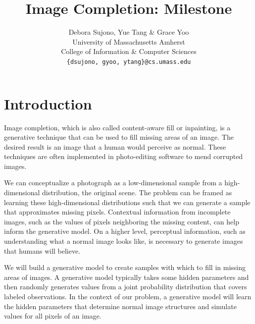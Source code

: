 \documentclass[10pt,twocolumn,letterpaper]{article}
\begin{document}
\title{Image Completion: Milestone}

\author{Debora Sujono, Yue Tang \& Grace Yoo \\ 
University of Massachusetts Amherst \\ 
College of Information \& Computer Sciences \\
{\tt\small \{dsujono, gyoo, ytang\}@cs.umass.edu} \\
}

\maketitle

\section{Introduction}
Image completion, which is also called content-aware fill or inpainting, is a generative technique that can be used to fill missing areas of an image. The desired result is an image that a human would perceive as normal. These techniques are often implemented in photo-editing software to mend corrupted images.

\par We can conceptualize a photograph as a low-dimensional sample from a high-dimensional distribution, the original scene. The problem can be framed as learning these high-dimensional distributions such that we can generate a sample that approximates missing pixels. Contextual information from incomplete images, such as the values of pixels neighboring the missing content, can help inform the generative model. On a higher level, perceptual information, such as understanding what a normal image looks like, is necessary to generate images that humans will believe. %

\par We will build a generative model to create samples with which to fill in missing areas of images. A generative model typically takes some hidden parameters and then randomly generates values from a joint probability distribution that covers labeled observations. In the context of our problem, a generative model will learn the hidden parameters that determine normal image structures and simulate values for all pixels of an image.
\end{document}
